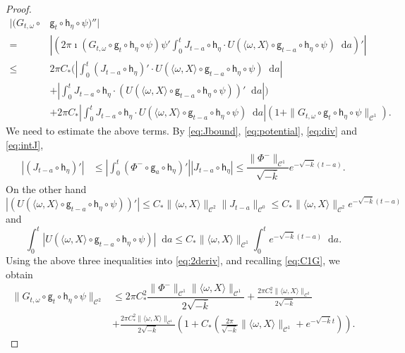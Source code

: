 \documentclass[10pt,a4paper]{amsart}
\newcommand \cC {{\mathscr{C}}}
\newcommand*{\diff}{\mathop{}\!\mathrm{d}}
\newcommand{\geo}{\mathsf{g}}
\newcommand{\horo}{\mathsf{h}}
\begin{document}
\begin{proof}
\begin{equation}\label{eq:2deriv}
\begin{split}
|(G_{t,\omega}\circ & \geo_t\circ \horo_\eta \circ \psi)''|\\
%
=&\left|\left( 2\pi\imath (G_{t,\omega}\circ \geo_t\circ \horo_\eta\circ \psi)\psi' \int_0^t J_{t-a}\circ \horo_\eta \cdot U(\langle \omega, X \rangle\circ \geo_{t-a}\circ \horo_\eta\circ \psi )\diff a \right)'\right|\\
%
\le & 2\pi C_* \bigg( \left| \int_0^t (J_{t-a}\circ \horo_\eta)' \cdot U(\langle \omega, X \rangle\circ \geo_{t-a}\circ \horo_\eta\circ \psi )\diff a \right|\\
%
&+ \left| \int_0^t J_{t-a}\circ \horo_\eta \cdot (U(\langle \omega, X \rangle\circ \geo_{t-a}\circ \horo_\eta\circ \psi ))'\diff a \right|\bigg)\\
%
&+2\pi C_*  \left| \int_0^t J_{t-a}\circ \horo_\eta \cdot U(\langle \omega, X \rangle\circ \geo_{t-a}\circ \horo_\eta\circ \psi )\diff a \right|(1+\|G_{t,\omega}\circ \geo_t\circ \horo_\eta\circ \psi\|_{\cC^1}).
\end{split}
\end{equation}
We need to estimate the above terms. By \eqref{eq:Jbound}, \eqref{eq:potential}, \eqref{eq:div} and \eqref{eq:intJ},
\[
\begin{split}
\left| (J_{t-a}\circ {\horo_\eta})' \right| &\le \left| \int_0^t (\Phi^{-} \circ \geo_a\circ \horo_\eta)' \right|\left| J_{t-a}\circ \horo_\eta \right|\le  \dfrac{\|\Phi^{-} \|_{\cC^1}}{\sqrt{-\overline k}}e^{-\sqrt{-\overline k}(t-a)}.
\end{split}
\]
On the other hand
\[
\left| (U(\langle \omega, X \rangle\circ \geo_{t-a}\circ \horo_\eta\circ \psi ))'\right| \le C_*\|\langle \omega, X \rangle\|_{\cC^2}\|J_{t-a}\|_{\cC^0}\le C_*\|\langle \omega, X \rangle\|_{\cC^2}e^{-\sqrt{-\overline k}(t-a)}
\]
and
\[
\int_0^t |U(\langle \omega, X \rangle\circ \geo_{t-a}\circ \horo_\eta\circ \psi )|\diff a \le C_*\|\langle \omega, X \rangle\|_{\cC^1}\int_0^t e^{-\sqrt{-\overline k}(t-a)}\diff a.
\]
Using the above three inequalities into \eqref{eq:2deriv}, and recalling \eqref{eq:C1G}, we obtain
\[
\begin{split}
\|G_{t,\omega}\circ  \geo_t\circ \horo_\eta \circ \psi\|_{\cC^2}&\le 2\pi C_*^2 \dfrac{\|\Phi^{-} \|_{\cC^1}\|\langle \omega, X \rangle\|_{\cC^1}}{2{\sqrt{-\overline k}}} + \frac{2\pi C_*^2\|\langle \omega, X \rangle\|_{\cC^2}}{2\sqrt{-\overline k}}\\
%
&+\frac{2\pi C_*^2\|\langle \omega, X \rangle\|_{\cC^1}}{2\sqrt{-\overline k}}\left(1+C_*\left(\frac{2\pi  }{\sqrt{-\overline k}}\|\langle \omega, X \rangle \|_{\cC^1} +e^{-\sqrt{-\overline k}t}\right)\right).

\end{split}\]
\end{proof}
\end{document}
